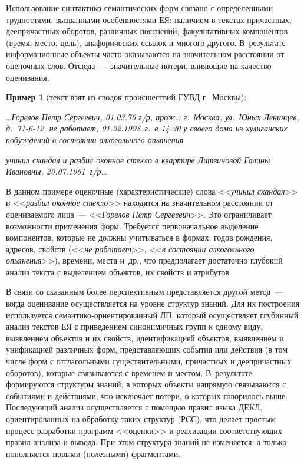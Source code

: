 \begin{multicols}{2}
     Использование синтактико-семантических форм связано с 
определенными трудностями, вызванными особенностями ЕЯ: наличием в 
текстах причастных, деепричастных оборотов, различных пояснений, 
факультативных компонентов (время, место, цель), анафорических ссылок и 
многого другого. В~результате информационные объекты часто оказываются 
на значительном расстоянии от оценочных слов. Отсюда~--- значительные 
потери, влияющие на качество оценивания. 

\medskip

\noindent
\textbf{Пример 1} (текст взят из сводок происшествий ГУВД г.\ Москвы):
     
     \ldots \textit{Горелов Петр Сергеевич, 01.03.76 г/р, прож.: г.~Москва, 
ул.~Юных Ленинцев, д.~71-6-12, не работает, 01.02.1998~г.\ в 14.30 у своего 
дома из хулиганских побуждений в состоянии алкогольного опьянения}\linebreak\vspace*{-12pt}
\columnbreak

\noindent
\textit{учинил 
скандал и разбил оконное стекло в квартире Литвиновой Галины Ивановны, 
20.07.1961~г/р\ldots}
     
     В данном примере оценочные (характеристические) слова 
<<\textit{учинил скандал}>> и <<\textit{разбил оконное стекло}>> находятся на 
значительном расстоянии от оцениваемого лица~--- <<\textit{Горелов Петр 
Сергеевич}>>. Это ограничивает возможности применения форм. Требуется 
первоначальное выделение компонентов, которые не должны учитываться в 
формах: годов рождения, адресов, свойств (<<\textit{не работает}>>, 
<<\textit{в состоянии алкогольного опьянения}>>), времени, мес\-та и~др., что 
предполагает достаточно глубокий анализ текста с выделением объектов, их 
свойств и атрибутов. 
     
     В связи со сказанным более перспективным представляется другой 
метод~--- когда оценивание осуществляется на уровне структур знаний. Для их 
построения используется се\-ман\-ти\-ко-ориен\-ти\-ро\-ван\-ный ЛП, который 
осуществляет глубинный анализ текстов ЕЯ с приведением синонимичных 
групп к одному виду, выявлением объектов и их свойств, идентификацией 
объектов, выявлением и унификацией различных форм, представляющих 
события или действия (в том числе форм с отглагольными существительными, 
причастных и деепричастных оборотов), которые связываются с временем и 
местом. В~результате формируются структуры знаний, в которых объекты 
напрямую связываются с событиями и действиями, что исключает потери, о 
которых говорилось выше. Последующий анализ осуществляется с помощью 
правил языка ДЕКЛ, ориентированных на обработку таких структур (РСС), что 
делает простым процесс разработки программ <<оценки>> и реализации 
соответствующих правил анализа и вывода. При этом структура знаний не 
изменяется, а только пополняется новыми (полезными) фрагментами. 
     

\end{multicols}
